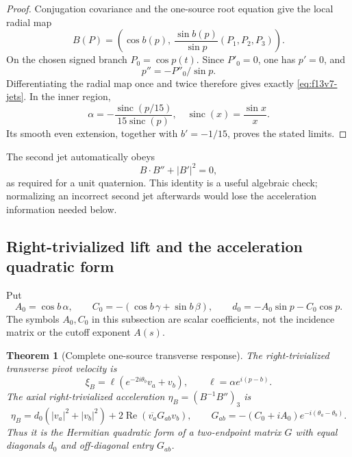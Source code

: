 \documentclass[11pt,oneside]{article}
\newtheorem{theorem}{Theorem}[section]
\begin{document}
\begin{proof}
Conjugation covariance and the one-source root
equation give the local radial map
\[
 B(P)=\left(\cos b(p),\
       \frac{\sin b(p)}{\sin p}(P_1,P_2,P_3)\right).
\]
On the chosen signed branch
\(P_0=\cos p(t)\). Since \(P'_0=0\), one has
\(p'=0\), and
\[
 p''=-P''_0/\sin p.
\]
Differentiating the radial map once and twice
therefore gives exactly
\eqref{eq:f13v7-jets}. In the inner region,
\[
 \alpha=-\frac{\operatorname{sinc}(p/15)}
                  {15\operatorname{sinc}(p)},
 \quad \operatorname{sinc}(x)=\frac{\sin x}{x}.
\]
Its smooth even extension, together with
\(b'=-1/15\), proves the stated limits.
\end{proof}

The second jet automatically obeys
\[
 B\cdot B''+|B'|^2=0,
\]
as required for a unit quaternion. This identity
is a useful algebraic check; normalizing an
incorrect second jet afterwards would lose
the acceleration information needed below.

\subsection{Right-trivialized lift and the acceleration quadratic form}

Put
\[
 A_0=\cos b\,\alpha,\qquad
 C_0=-(\cos b\,\gamma+\sin b\,\beta),\qquad
 d_0=-A_0\sin p-C_0\cos p .
\]
The symbols \(A_0,C_0\) in this subsection are
scalar coefficients, not the incidence matrix
or the cutoff exponent \(A(s)\).

\begin{theorem}[Complete one-source transverse response]
\label{thm:f13v7-response}
The right-trivialized transverse pivot velocity is
\begin{equation}\label{eq:f13v7-lift}
 \xi_B=\ell(e^{-2i\theta_b}v_a+v_b),
 \qquad \ell=\alpha e^{i(p-b)}.
\end{equation}
The axial right-trivialized acceleration
\(\eta_B=(B^{-1}B'')_3\) is
\begin{equation}\label{eq:f13v7-acceleration}
 \eta_B
 =d_0(|v_a|^2+|v_b|^2)
        +2\operatorname{Re}(\overline{v_a}G_{ab}v_b),
 \qquad
 G_{ab}=-(C_0+iA_0)e^{-i(\theta_a-\theta_b)} .
\end{equation}
Thus it is the Hermitian quadratic form of a
two-endpoint matrix \(G\) with equal diagonals
\(d_0\) and off-diagonal entry \(G_{ab}\).
\end{theorem}
\end{document}
